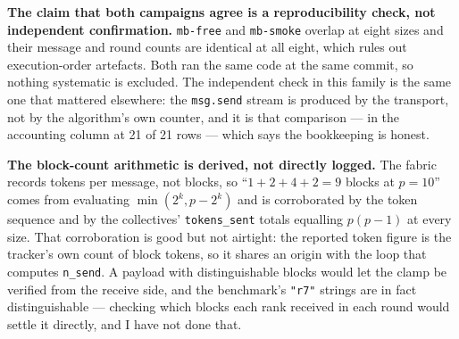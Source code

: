 \documentclass[11pt]{article}
\begin{document}
\textbf{The claim that both campaigns agree is a reproducibility check, not independent
confirmation.} \texttt{mb-free} and \texttt{mb-smoke} overlap at eight sizes and their message and
round counts are identical at all eight, which rules out execution-order artefacts. Both ran the
same code at the same commit, so nothing systematic is excluded. The independent check in this
family is the same one that mattered elsewhere: the \texttt{msg.send} stream is produced by the
transport, not by the algorithm's own counter, and it is that comparison --- \modelok{} in the
accounting column at 21 of 21 rows --- which says the bookkeeping is honest.

\textbf{The block-count arithmetic is derived, not directly logged.} The fabric records tokens per
message, not blocks, so ``$1+2+4+2 = 9$ blocks at $p=10$'' comes from evaluating
$\min(2^k, p-2^k)$ and is corroborated by the token sequence and by the collectives'
\texttt{tokens\_sent} totals equalling $p(p-1)$ at every size. That corroboration is good but not
airtight: the reported token figure is the tracker's own count of block tokens, so it shares an
origin with the loop that computes \texttt{n\_send}. A payload with distinguishable blocks would
let the clamp be verified from the receive side, and the benchmark's \texttt{"r7"} strings are in
fact distinguishable --- checking which blocks each rank received in each round would settle it
directly, and I have not done that.
\end{document}

